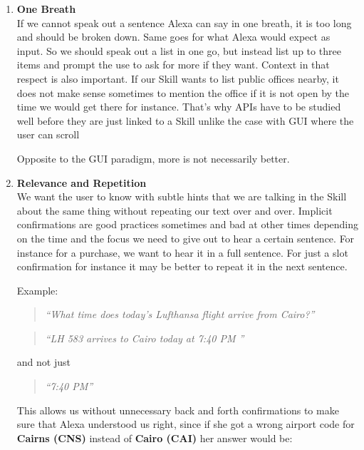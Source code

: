 \begin{enumerate}
\item \textbf{One Breath}\\
If we cannot speak out a sentence Alexa can say in one breath, it is too long and should be broken down. Same goes for what Alexa would expect as input. %
So we should speak out a list in one go, but instead list up to three items and prompt the use to ask for more if they want. Context in that respect is also important. If our Skill wants to list public offices nearby, it does not make sense sometimes to mention the office if it is not open by the time we would get there for instance. That's why APIs have to be studied well before they are just linked to a Skill unlike the case with GUI where the user can scroll

Opposite to the GUI paradigm, more is not necessarily better.

\item \textbf{Relevance and Repetition}\\

We want the user to know with subtle hints that we are talking in the Skill about the same thing without repeating our text over and over. Implicit confirmations are good practices sometimes and bad at other times depending on the time and the focus we need to give out to hear a certain sentence. For instance for a purchase, we want to hear it in a full sentence. For just a slot confirmation for instance it may be better to repeat it in the next sentence.

Example:


 \begin{quotation}
	\textit{	``What time does today's Lufthansa flight arrive from Cairo?''}
\end{quotation}


\begin{quotation}
	\flushright
	\textit{	``LH 583 arrives to Cairo today at 7:40 PM ''} \\
\end{quotation}

	and not just\\
\begin{quotation}
	\flushright

	\textit{``7:40 PM''} 
\end{quotation}

This allows us without unnecessary back and forth confirmations to make sure that Alexa understood us right, since if she got a wrong airport code for \textbf{Cairns (CNS)} instead of \textbf{Cairo (CAI)} her answer would be:


\end{enumerate}
